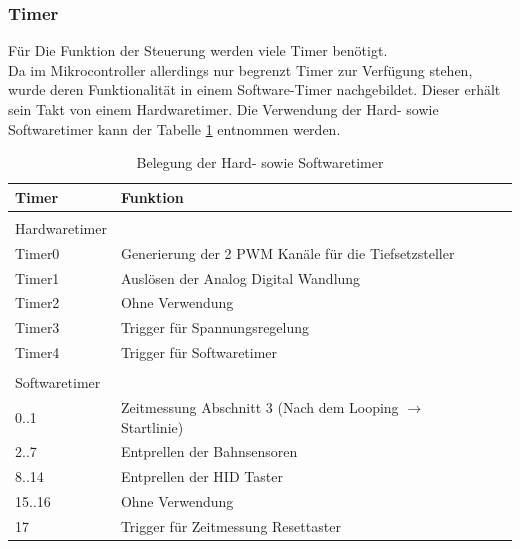 \documentclass[a4paper, 11pt]{report}
\begin{document}
			\subsubsection{Timer}\label{subsubsec:Timer}
			Für Die Funktion der Steuerung werden viele Timer benötigt.\\
			Da im Mikrocontroller allerdings nur begrenzt Timer zur Verfügung stehen, wurde deren Funktionalität in einem Software-Timer nachgebildet.
			Dieser erhält sein Takt von einem Hardwaretimer.
			Die Verwendung der Hard- sowie Softwaretimer kann der Tabelle \ref{tab:belegungTimer} entnommen werden.
				\begin{table}[ht]
					\begin{tabular}{|l|l|l|}
						\hline
						\textbf{Timer} & \textbf{Funktion}\\
						\hline
						\hline
						 & \\
						Hardwaretimer &\\
						\hline
						\hline
						Timer0 & Generierung der 2 PWM Kanäle für die Tiefsetzsteller\\
						\hline
						Timer1 & Auslösen der Analog Digital Wandlung\\
						\hline
						Timer2 & Ohne Verwendung\\
						\hline
						Timer3 & Trigger für Spannungsregelung\\
						\hline
						Timer4 & Trigger für Softwaretimer\\
						\hline
						\hline
						 & \\
						Softwaretimer &\\
						\hline
						\hline
						0..1 & Zeitmessung Abschnitt 3 (Nach dem Looping $\rightarrow$ Startlinie)\\
						\hline
						2..7 & Entprellen der Bahnsensoren\\
						\hline
						8..14 & Entprellen der HID Taster\\
						\hline
						15..16 & Ohne Verwendung\\
						\hline
						17 & Trigger für Zeitmessung Resettaster\\
						\hline
					\end{tabular}
					\caption{Belegung der Hard- sowie Softwaretimer}
					\label{tab:belegungTimer}
				\end{table}
\end{document}
